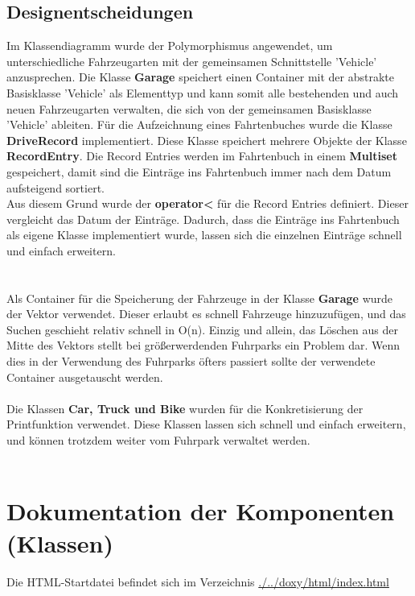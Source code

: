 \documentclass[12pt,naustrian,a4widepaper]{scrartcl}
\begin{document}
\subsection{Designentscheidungen}
Im Klassendiagramm wurde der Polymorphismus angewendet, um unterschiedliche Fahrzeugarten mit der gemeinsamen Schnittstelle 'Vehicle' anzusprechen. Die Klasse \textbf{Garage} speichert einen Container mit der abstrakte Basisklasse 'Vehicle' als Elementtyp und kann somit alle bestehenden und auch neuen Fahrzeugarten verwalten, die sich von der gemeinsamen Basisklasse 'Vehicle' ableiten.
Für die Aufzeichnung eines Fahrtenbuches wurde die Klasse \textbf{DriveRecord} implementiert. Diese Klasse speichert mehrere Objekte der Klasse \textbf{RecordEntry}.
Die Record Entries werden im Fahrtenbuch in einem \textbf{Multiset} gespeichert, damit sind die Einträge ins Fahrtenbuch immer nach dem Datum aufsteigend sortiert.
\\Aus diesem Grund wurde der \textbf{operator<} für die Record Entries definiert. Dieser vergleicht das Datum der Einträge.
Dadurch, dass die Einträge ins Fahrtenbuch als eigene Klasse implementiert wurde, lassen sich die einzelnen Einträge schnell und einfach erweitern.\\
\\
\\
Als Container für die Speicherung der Fahrzeuge in der Klasse \textbf{Garage} wurde der Vektor verwendet. 
Dieser erlaubt es schnell Fahrzeuge hinzuzufügen, und das Suchen geschieht relativ schnell in O(n).
Einzig und allein, das Löschen aus der Mitte des Vektors stellt bei größerwerdenden Fuhrparks ein Problem dar.
Wenn dies in der Verwendung des Fuhrparks öfters passiert sollte der verwendete Container ausgetauscht werden.
\\
\\
Die Klassen \textbf{Car, Truck und Bike} wurden für die Konkretisierung der Printfunktion verwendet.
Diese Klassen lassen sich schnell und einfach erweitern, und können trotzdem weiter vom Fuhrpark verwaltet werden.\\
\\

\color{black}

\section{Dokumentation der Komponenten (Klassen)}
Die HTML-Startdatei befindet sich im Verzeichnis \href{run:./../doxy/html/index.html}{./../doxy/html/index.html}
\end{document}
